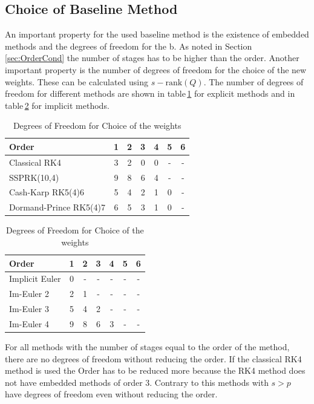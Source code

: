 \documentclass[a4paper]{scrartcl}
\numberwithin{equation}{section}
\theoremstyle{plain}
\theoremstyle{definition}
\numberwithin{theorem}{section}
\newcommand{\1}{\mathbbm{1}}
\begin{document}
\subsection{Choice of Baseline Method}
An important property for the used baseline method is the existence of embedded methods and the degrees of freedom for the b.
As noted in Section\,\ref{sec:OrderCond} the number of stages has to be higher than the order. 
Another important property is the number of degrees of freedom for the choice of the new weights. 
These can be calculated using $s-\mathrm{rank}(Q)$.%
The number of degrees of freedom for different methods are shown in table\,\ref{table:DOF_exp} for explicit methods and in table\,\ref{table:DOF_imp} for implicit methods.

\begin{table}[h!]
\centering    %
\begin{tabular}{|l |c c c c c c |} 
 \hline 
Order &1&2&3&4&5&6 \\ 
 \hline Classical RK4&3&2&0&0& - & -  \\ 
 SSPRK(10,4)&9&8&6&4& - & -  \\ 
 Cash-Karp RK5(4)6&5&4&2&1&0& -  \\ 
 Dormand-Prince RK5(4)7&6&5&3&1&0& -  \\ 
 \hline 
 \end{tabular}
 \caption{Degrees of Freedom for Choice of the weights} %
 \label{table:DOF_exp}
 \end{table}
 
 \begin{table}[h!]
\centering   %
 \begin{tabular}{|l |c c c c c c |} 
 \hline 
Order &1&2&3&4&5&6 \\ 
 \hline Implicit Euler&0& - & - & - & - & -  \\ 
 Im-Euler 2&2&1& - & - & - & -  \\ 
 Im-Euler 3&5&4&2& - & - & -  \\ 
 Im-Euler 4&9&8&6&3& - & -  \\ 
 \hline 
 \end{tabular}
 \caption{Degrees of Freedom for Choice of the weights} %
 \label{table:DOF_imp}
 \end{table}


For all methods with the number of stages equal to the order of the method, there are no degrees of freedom without reducing the order. 
If the classical RK4 method is used the Order has to be reduced more because the RK4 method does not have embedded methods of order 3.
Contrary to this methods with $s > p$ have degrees of freedom even without reducing the order. 
\end{document}
